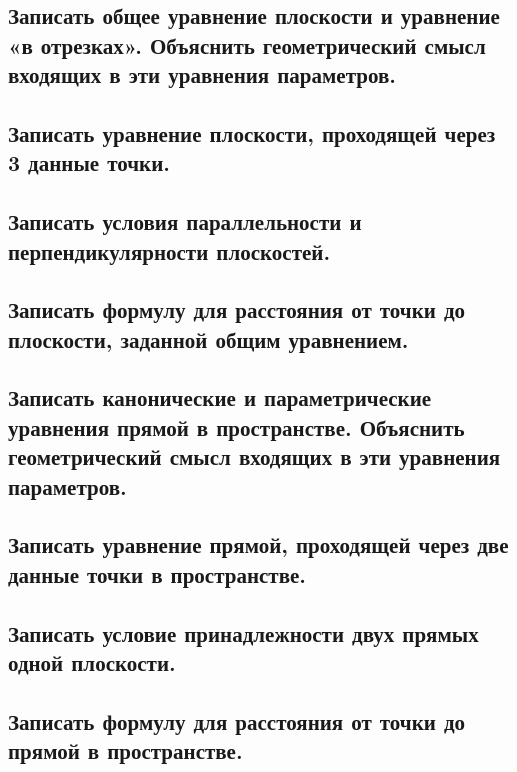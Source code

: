 \documentclass[a4paper, 10pt]{article}
\begin{document}
\subsection{Записать общее уравнение плоскости и уравнение «в отрезках». Объяснить 
геометрический смысл входящих в эти уравнения параметров.}



\subsection{Записать уравнение плоскости, проходящей через 3 данные точки.}



\subsection{Записать условия параллельности и перпендикулярности плоскостей.}



\subsection{Записать формулу для расстояния от точки до плоскости, заданной общим уравнением. }



\subsection{Записать канонические и параметрические уравнения прямой в пространстве. 
Объяснить геометрический смысл входящих в эти уравнения параметров.}



\subsection{Записать уравнение прямой, проходящей через две данные точки в пространстве. }



\subsection{Записать условие принадлежности двух прямых одной плоскости.}



\subsection{Записать формулу для расстояния от точки до прямой в пространстве.}
\end{document}
